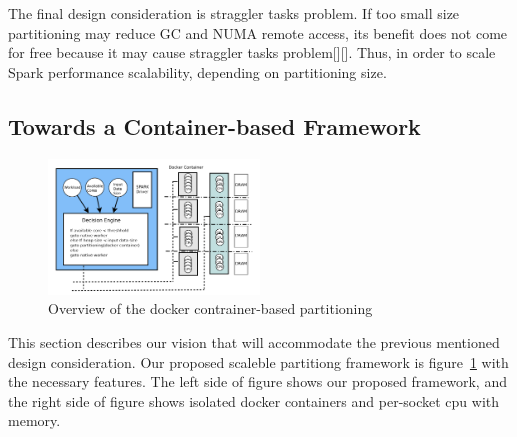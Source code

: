 \fi



\ifkor
The final design consideration is straggler tasks problem. 
If too small size partitioning may reduce GC and NUMA remote access, its benefit
does not come for free because it may cause straggler tasks problem[][].
Thus, in order to scale Spark performance scalability,  depending on
partitioning size.
\else

\fi


\subsection{Towards a Container-based Framework}

\begin{figure}[h]
  \begin{center}
     \includegraphics[width=0.5\textwidth]{fig/jaildocker}
  \end{center}
  \caption{Overview of the docker contrainer-based
  partitioning}
  \label{fig:basic}
\end{figure}

\ifkor
This section describes our vision that will accommodate the previous
mentioned design consideration.
Our proposed scaleble partitiong framework is figure~\ref{fig:basic} with the
necessary features.
The left side of figure shows our proposed framework, and the right side of
figure shows isolated docker containers and per-socket cpu with memory.

